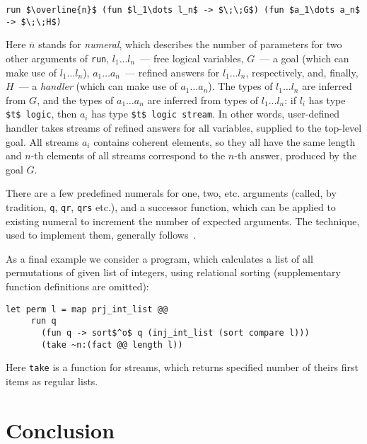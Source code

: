 \documentclass[10pt, oneside, nocopyrightspace]{sigplanconf}
\begin{document}
\begin{lstlisting}[mathescape=true]
   run $\overline{n}$ (fun $l_1\dots l_n$ -> $\;\;G$) (fun $a_1\dots a_n$ -> $\;\;H$)
\end{lstlisting}

Here $\overline{n}$ stands for \emph{numeral}, which describes the number of
parameters for two other arguments of \lstinline{run}, \mbox{$l_1\dots l_n$}~---
free logical variables, $G$~--- a goal (which can make use of \mbox{$l_1\dots l_n$}), 
\mbox{$a_1\dots a_n$}~--- refined answers for \mbox{$l_1\dots l_n$}, respectively, and, 
finally, $H$~--- a \emph{handler} (which can make use of \mbox{$a_1\dots a_n$}). The types of 
\mbox{$l_1\dots l_n$} are inferred from $G$, and the types of \mbox{$a_1\dots a_n$} are
inferred from types of \mbox{$l_1\dots l_n$}: if $l_i$ has type \lstinline[mathescape=true]{$t$ logic}, then
$a_i$ has type \lstinline[mathescape=true]{$t$ logic stream}. In other words, user-defined handler
takes streams of refined answers for all variables, supplied to the top-level goal. All streams $a_i$ contains
coherent elements, so they all have the same length and $n$-th elements of all streams correspond 
to the $n$-th answer, produced by the goal $G$.

There are a few predefined numerals for one, two, etc. arguments (called, by tradition, 
\lstinline{q}, \lstinline{qr}, \lstinline{qrs} etc.), and a successor function, which 
can be applied to existing numeral to increment the number of expected arguments. The
technique, used to implement them, generally follows~\cite{Unparsing, DoWeNeed}.

As a final example we consider a program, which calculates a list of all permutations of
given list of integers, using relational sorting (supplementary function definitions are
omitted):

\begin{lstlisting}[mathescape=true]
   let perm l = map prj_int_list @@ 
     run q 
       (fun q -> sort$^o$ q (inj_int_list (sort compare l))) 
       (take ~n:(fact @@ length l))
\end{lstlisting}

Here \lstinline{take} is a function for streams, which returns specified number of
theirs first items as regular lists.

\section{Conclusion}
\end{document}
